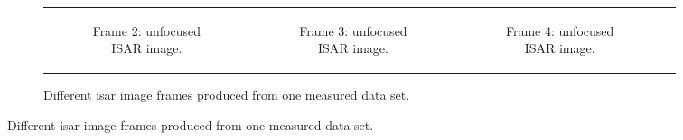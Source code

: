 \documentclass[class=report,11pt,crop=false]{standalone}
\begin{document}
\begin{figure}[H]
\begin{minipage}{0.9\linewidth}
\begin{figure}
\begin{tabular}{@{}cccc@{}}
\begin{subfigure}{0.25\linewidth}
                        \resizebox{\linewidth}{!}{}
                        \caption{Frame 2: unfocused ISAR image.}
                    \end{subfigure}
                    &
                    \begin{subfigure}{0.25\linewidth}
                        \centering
                        \resizebox{\linewidth}{!}{}
                         \caption{Frame 3: unfocused ISAR image.}
                    \end{subfigure}
                    &
                    \begin{subfigure}{0.25\linewidth}
                        \centering
                        \resizebox{\linewidth}{!}{}
                         \caption{Frame 4: unfocused ISAR image.}
                    \end{subfigure}
                \end{tabular}
                \caption{Different \gls{isar} image frames produced from one measured data set. \label{fig:measured_data_frames}}
            \end{figure}
        \end{minipage}
        \vspace*{-1.5\baselineskip}
    \end{figure}
\end{document}
